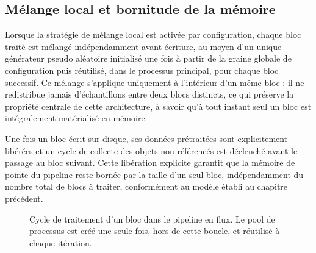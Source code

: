 \documentclass[12pt,a4paper]{report}
\begin{document}
\subsection{Mélange local et bornitude de la mémoire}

Lorsque la stratégie de mélange local est activée par configuration, chaque bloc traité est mélangé indépendamment avant écriture, au moyen d'un unique générateur pseudo aléatoire initialisé une fois à partir de la graine globale de configuration puis réutilisé, dans le processus principal, pour chaque bloc successif. Ce mélange s'applique uniquement à l'intérieur d'un même bloc : il ne redistribue jamais d'échantillons entre deux blocs distincts, ce qui préserve la propriété centrale de cette architecture, à savoir qu'à tout instant seul un bloc est intégralement matérialisé en mémoire.

Une fois un bloc écrit sur disque, ses données prétraitées sont explicitement libérées et un cycle de collecte des objets non référencés est déclenché avant le passage au bloc suivant. Cette libération explicite garantit que la mémoire de pointe du pipeline reste bornée par la taille d'un seul bloc, indépendamment du nombre total de blocs à traiter, conformément au modèle établi au chapitre précédent.

\begin{figure}[htbp]
  \centering
  \caption{Cycle de traitement d'un bloc dans le pipeline en flux. Le pool de processus est créé une seule fois, hors de cette boucle, et réutilisé à chaque itération.}
  \label{fig:pipeline_flux}
\end{figure}
\end{document}
